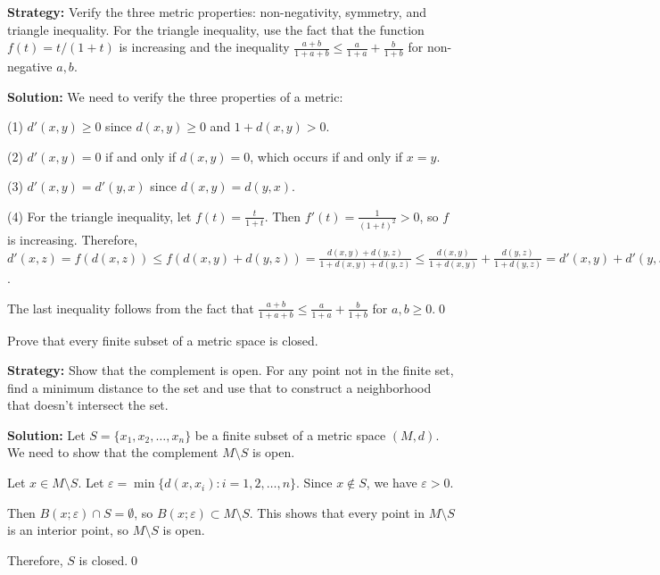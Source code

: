 \noindent\textbf{Strategy:} Verify the three metric properties: non-negativity, symmetry, and triangle inequality. For the triangle inequality, use the fact that the function $f(t) = t/(1+t)$ is increasing and the inequality $\frac{a+b}{1+a+b} \leq \frac{a}{1+a} + \frac{b}{1+b}$ for non-negative $a,b$.

\bigskip\noindent\textbf{Solution:} We need to verify the three properties of a metric:

(1) $d'(x,y) \geq 0$ since $d(x,y) \geq 0$ and $1 + d(x,y) > 0$.

(2) $d'(x,y) = 0$ if and only if $d(x,y) = 0$, which occurs if and only if $x = y$.

(3) $d'(x,y) = d'(y,x)$ since $d(x,y) = d(y,x)$.

(4) For the triangle inequality, let $f(t) = \frac{t}{1+t}$. Then $f'(t) = \frac{1}{(1+t)^2} > 0$, so $f$ is increasing. Therefore, $d'(x,z) = f(d(x,z)) \leq f(d(x,y) + d(y,z)) = \frac{d(x,y) + d(y,z)}{1 + d(x,y) + d(y,z)} \leq \frac{d(x,y)}{1 + d(x,y)} + \frac{d(y,z)}{1 + d(y,z)} = d'(x,y) + d'(y,z)$.

The last inequality follows from the fact that $\frac{a+b}{1+a+b} \leq \frac{a}{1+a} + \frac{b}{1+b}$ for $a,b \geq 0$.\qed


\begin{problembox}
\begin{problemstatement}
Prove that every finite subset of a metric space is closed.
\end{problemstatement}
\end{problembox}

\noindent\textbf{Strategy:} Show that the complement is open. For any point not in the finite set, find a minimum distance to the set and use that to construct a neighborhood that doesn't intersect the set.

\bigskip\noindent\textbf{Solution:} Let $S = \{x_1, x_2, \ldots, x_n\}$ be a finite subset of a metric space $(M,d)$. We need to show that the complement $M \setminus S$ is open.

Let $x \in M \setminus S$. Let $\varepsilon = \min\{d(x,x_i) : i = 1,2,\ldots,n\}$. Since $x \notin S$, we have $\varepsilon > 0$.

Then $B(x;\varepsilon) \cap S = \emptyset$, so $B(x;\varepsilon) \subset M \setminus S$. This shows that every point in $M \setminus S$ is an interior point, so $M \setminus S$ is open.

Therefore, $S$ is closed.\qed


